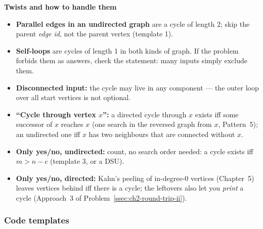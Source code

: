 \textbf{Twists and how to handle them}
\begin{itemize}[leftmargin=*]
    \item \textbf{Parallel edges in an undirected graph} are a cycle of length 2; skip the parent \emph{edge id}, not the parent vertex (template 1).
    \item \textbf{Self-loops} are cycles of length 1 in both kinds of graph. If the problem forbids them as answers, check the statement: many inputs simply exclude them.
    \item \textbf{Disconnected input:} the cycle may live in any component --- the outer loop over all start vertices is not optional.
    \item \textbf{``Cycle through vertex $x$'':} a directed cycle through $x$ exists iff some successor of $x$ reaches $x$ (one search in the reversed graph from $x$, Pattern~5); an undirected one iff $x$ has two neighbours that are connected without $x$.
    \item \textbf{Only yes/no, undirected:} count, no search order needed: a cycle exists iff $m > n - c$ (template 3, or a DSU).
    \item \textbf{Only yes/no, directed:} Kahn's peeling of in-degree-0 vertices (Chapter~5) leaves vertices behind iff there is a cycle; the leftovers also let you \emph{print} a cycle (Approach~3 of Problem~\ref{ssec:ch2-round-trip-ii}).
\end{itemize}

\subsubsection*{Code templates}

